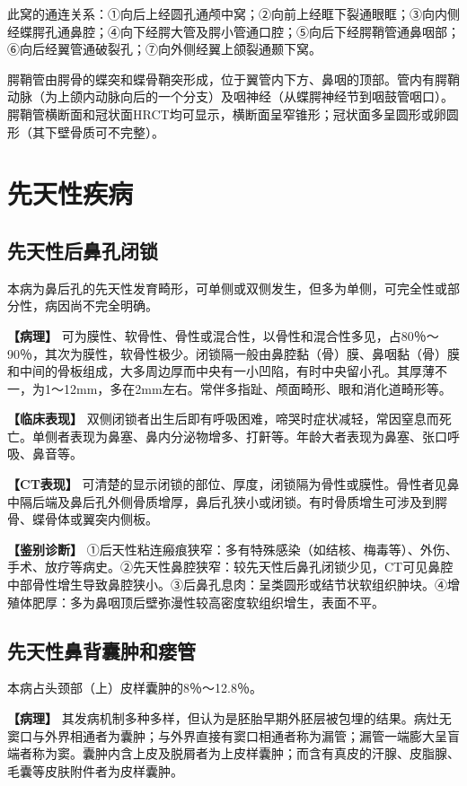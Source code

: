此窝的通连关系：①向后上经圆孔通颅中窝；②向前上经眶下裂通眼眶；③向内侧经蝶腭孔通鼻腔；④向下经腭大管及腭小管通口腔；⑤向后下经腭鞘管通鼻咽部；⑥向后经翼管通破裂孔；⑦向外侧经翼上颌裂通颞下窝。

腭鞘管由腭骨的蝶突和蝶骨鞘突形成，位于翼管内下方、鼻咽的顶部。管内有腭鞘动脉（为上颌内动脉向后的一个分支）及咽神经（从蝶腭神经节到咽鼓管咽口）。腭鞘管横断面和冠状面HRCT均可显示，横断面呈窄锥形；冠状面多呈圆形或卵圆形（其下壁骨质可不完整）。

\section{先天性疾病}

\subsection{先天性后鼻孔闭锁}

本病为鼻后孔的先天性发育畸形，可单侧或双侧发生，但多为单侧，可完全性或部分性，病因尚不完全明确。

\textbf{【病理】}
可为膜性、软骨性、骨性或混合性，以骨性和混合性多见，占80％～90％，其次为膜性，软骨性极少。闭锁隔一般由鼻腔黏（骨）膜、鼻咽黏（骨）膜和中间的骨板组成，大多周边厚而中央有一小凹陷，有时中央留小孔。其厚薄不一，为1～12mm，多在2mm左右。常伴多指趾、颅面畸形、眼和消化道畸形等。

\textbf{【临床表现】}
双侧闭锁者出生后即有呼吸困难，啼哭时症状减轻，常因窒息而死亡。单侧者表现为鼻塞、鼻内分泌物增多、打鼾等。年龄大者表现为鼻塞、张口呼吸、鼻音等。

\textbf{【CT表现】}
可清楚的显示闭锁的部位、厚度，闭锁隔为骨性或膜性。骨性者见鼻中隔后端及鼻后孔外侧骨质增厚，鼻后孔狭小或闭锁。有时骨质增生可涉及到腭骨、蝶骨体或翼突内侧板。

\textbf{【鉴别诊断】}
①后天性粘连瘢痕狭窄：多有特殊感染（如结核、梅毒等）、外伤、手术、放疗等病史。②先天性鼻腔狭窄：较先天性后鼻孔闭锁少见，CT可见鼻腔中部骨性增生导致鼻腔狭小。③后鼻孔息肉：呈类圆形或结节状软组织肿块。④增殖体肥厚：多为鼻咽顶后壁弥漫性较高密度软组织增生，表面不平。

\subsection{先天性鼻背囊肿和瘘管}

本病占头颈部（上）皮样囊肿的8％～12.8％。

\textbf{【病理】}
其发病机制多种多样，但认为是胚胎早期外胚层被包埋的结果。病灶无窦口与外界相通者为囊肿；与外界直接有窦口相通者称为漏管；漏管一端膨大呈盲端者称为窦。囊肿内含上皮及脱屑者为上皮样囊肿；而含有真皮的汗腺、皮脂腺、毛囊等皮肤附件者为皮样囊肿。

